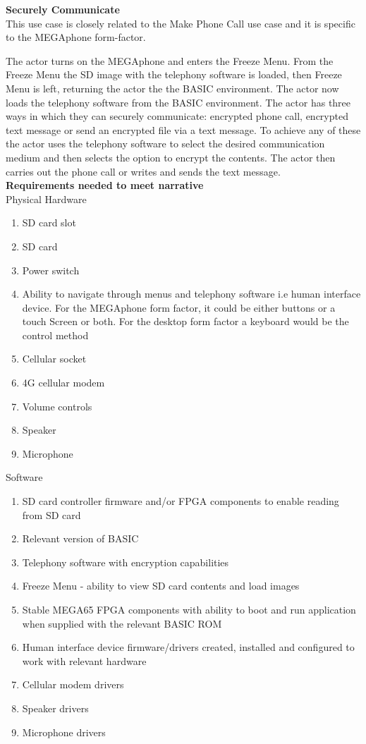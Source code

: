 \textbf{Securely Communicate}\\
This use case is closely related to the Make Phone Call use case and it is specific to the MEGAphone form-factor.

The actor turns on the MEGAphone and enters the Freeze Menu. From the Freeze Menu the SD image with the telephony software is loaded, then Freeze Menu is left, returning the actor the the BASIC environment. The actor now loads the telephony software from the BASIC environment. The actor has three ways in which they can securely communicate: encrypted phone call, encrypted text message or send an encrypted file via a text message. To achieve any of these the actor uses the telephony software to select the desired communication medium and then selects the option to encrypt the contents. The actor then carries out the phone call or writes and sends the text message. \\

\textbf{Requirements needed to meet narrative}\\
Physical Hardware
\begin{enumerate}
\item SD card slot
\item SD card
\item Power switch
\item Ability to navigate through menus and telephony software i.e human interface device. For the MEGAphone form factor, it could be either buttons or a touch Screen or both. For the desktop form factor a keyboard would be the control method
\item Cellular socket
\item 4G cellular modem
\item Volume controls
\item Speaker
\item Microphone
\end{enumerate}

Software\\
\begin{enumerate}
\item SD card controller firmware and/or FPGA components to enable reading from SD card
\item Relevant version of BASIC 
\item Telephony software with encryption capabilities
\item Freeze Menu - ability to view SD card contents and load images
\item Stable MEGA65 FPGA components with ability to boot and run application when supplied with the relevant BASIC ROM
\item Human interface device firmware/drivers created, installed and configured to work with relevant hardware
\item Cellular modem drivers
\item Speaker drivers
\item Microphone drivers
\end{enumerate}

